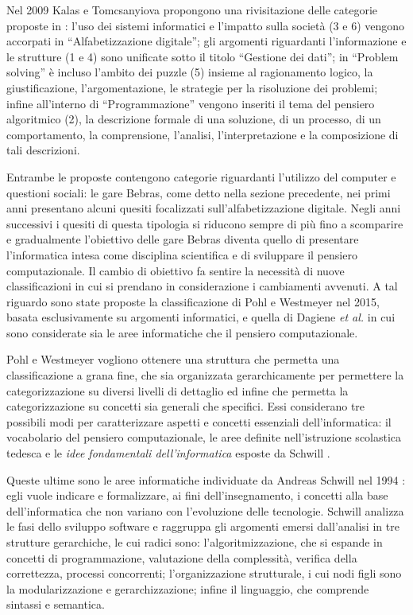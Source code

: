 \documentclass[12pt]{report}
\begin{document}
Nel 2009 Kalas e Tomcsanyiova \cite{KalasIFIP2009} propongono una rivisitazione delle categorie proposte in \cite{DagieneISEEP2008}: l'uso dei sistemi informatici e l'impatto sulla società (3 e 6) vengono accorpati in ``Alfabetizzazione digitale''; gli argomenti riguardanti l'informazione e le strutture (1 e 4) sono unificate sotto il titolo ``Gestione dei dati''; in ``Problem solving''  è incluso l'ambito dei puzzle (5) insieme al ragionamento logico, la giustificazione, l'argomentazione, le strategie per la risoluzione dei problemi; infine all'interno di ``Programmazione'' vengono inseriti il tema del pensiero algoritmico (2), la descrizione formale di una soluzione, di un processo, di un comportamento, la comprensione, l'analisi, l'interpretazione e la composizione di tali descrizioni. 
 
Entrambe le proposte contengono categorie riguardanti l'utilizzo del computer e questioni sociali: le gare Bebras, come detto nella sezione precedente, nei primi anni presentano alcuni quesiti focalizzati sull'alfabetizzazione digitale. Negli anni successivi i quesiti di questa tipologia si riducono sempre di più fino a scomparire e gradualmente l'obiettivo delle gare Bebras diventa quello di presentare l'informatica intesa come disciplina scientifica e di sviluppare il pensiero computazionale. 
Il cambio di obiettivo fa sentire la necessità di nuove classificazioni in cui si prendano in considerazione i cambiamenti avvenuti. A tal riguardo sono state proposte la classificazione di Pohl e Westmeyer \cite{PohlLNCS2015} nel 2015, basata esclusivamente su argomenti informatici, e quella di Dagiene \textit{et al.} \cite{DagieneINFORMATICA2017} in cui sono considerate sia le aree informatiche che il pensiero computazionale.

Pohl e Westmeyer \cite{PohlLNCS2015} vogliono ottenere una struttura che permetta una classificazione a grana fine, che sia organizzata gerarchicamente per permettere la categorizzazione su diversi livelli di dettaglio ed infine che permetta la categorizzazione su concetti sia generali che specifici.
Essi considerano tre possibili modi per caratterizzare aspetti e concetti essenziali dell'informatica: il vocabolario del pensiero computazionale, le aree definite nell'istruzione scolastica tedesca e le \textit{idee fondamentali dell'informatica} esposte da Schwill \cite{SchwillEATCS1994}.

Queste ultime sono le aree informatiche individuate da Andreas Schwill nel 1994 \cite{SchwillEATCS1994}: egli vuole indicare e formalizzare, ai fini dell'insegnamento, i concetti alla base dell'informatica che non variano con l'evoluzione delle tecnologie.
Schwill analizza le fasi dello sviluppo software e raggruppa gli argomenti emersi dall'analisi in tre strutture gerarchiche, le cui radici sono: l'algoritmizzazione, che si espande in concetti di programmazione, valutazione della complessità, verifica della correttezza, processi concorrenti; l'organizzazione strutturale, i cui nodi figli sono la modularizzazione e gerarchizzazione; infine il linguaggio, che comprende sintassi e semantica.
\end{document}
